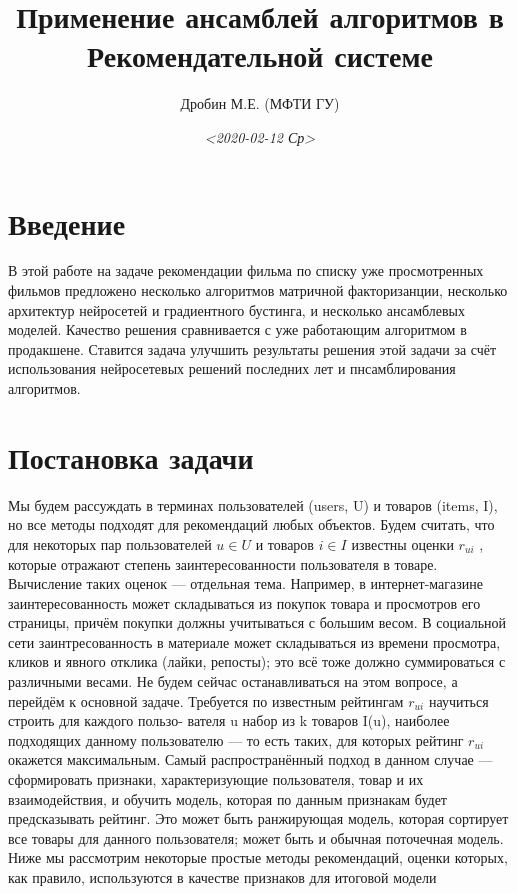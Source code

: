 \documentclass[11pt]{article}
\author{Дробин М.Е. (МФТИ ГУ)}
\date{\textit{<2020-02-12 Ср>}}
\title{Применение ансамблей алгоритмов в Рекомендательной системе}
\begin{document}
\maketitle
\tableofcontents

\begin{abstract}
\end{abstract}

\section{Введение}
\label{sec:org849ae77}
В этой работе на задаче рекомендации фильма по списку уже просмотренных фильмов предложено несколько алгоритмов матричной факторизанции,
несколько архитектур нейросетей и градиентного бустинга, и несколько ансамблевых моделей. Качество решения сравнивается с уже работающим
алгоритмом в продакшене. Ставится задача улучшить результаты решения этой задачи за счёт использования нейросетевых решений последних лет и
пнсамблирования алгоритмов.
\section{Постановка задачи}
\label{sec:orga4018da}
Мы будем рассуждать в терминах пользователей (users, U) и товаров (items,
I), но все методы подходят для рекомендаций любых объектов. Будем считать, что
для некоторых пар пользователей \(u \in U\) и товаров \(i \in I\) известны оценки \(r_{ui}\) , которые отражают степень заинтересованности пользователя в
товаре. Вычисление таких оценок — отдельная тема. Например, в интернет-магазине заинтересованность может складываться из покупок товара и просмотров его страницы, причём покупки должны учитываться с большим весом. В социальной сети заинтресованность в материале может складываться из времени просмотра, кликов и явного отклика (лайки, репосты); это всё тоже должно суммироваться с различными весами. Не будем сейчас останавливаться на этом вопросе, а перейдём к основной задаче.
Требуется по известным рейтингам \(r_{ui}\) научиться строить для каждого пользо-
вателя u набор из k товаров I(u), наиболее подходящих данному пользователю — то есть таких, для которых рейтинг \(r_{ui}\) окажется максимальным. Самый распространённый подход в данном случае — сформировать признаки, характеризующие пользователя, товар и их взаимодействия, и обучить модель, которая по данным признакам будет предсказывать рейтинг. Это может быть ранжирующая модель, которая сортирует все товары для данного пользователя; может
быть и обычная поточечная модель. Ниже мы рассмотрим некоторые простые методы рекомендаций, оценки которых, как правило, используются в качестве признаков
для итоговой модели
\end{document}
